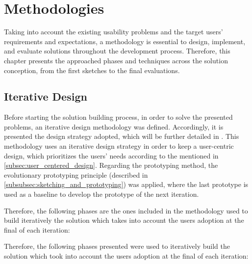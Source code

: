 

\chapter{Methodologies}
\label{cha:methodologies}
Taking into account the existing usability problems and the target users' requirements and expectations, a methodology is essential to design, implement, and evaluate solutions throughout the development process. Therefore, this chapter presents the approached phases and techniques across the solution conception, from the first sketches to the final evaluations. 

\section{Iterative Design}
\label{sec:iterative_design}
Before starting the solution building process, in order to solve the presented problems, an iterative design methodology was defined. Accordingly, it is presented the design strategy adopted, which will be further detailed in . This methodology uses an iterative design strategy in order to keep a user-centric design, which prioritizes the users' needs according to the mentioned in \ref{subsec:user_centered_design}. Regarding the prototyping method, the evolutionary prototyping principle (described in \ref{subsubsec:sketching_and_prototyping}) was applied, where the last prototype is used as a baseline to develop the prototype of the next iteration.

Therefore, the following phases are the ones included in the methodology used to build iteratively the solution which takes into account the users adoption at the final of each iteration:

Therefore, the following phases presented were used to iteratively build the solution which took into account the users adoption at the final of each iteration:

